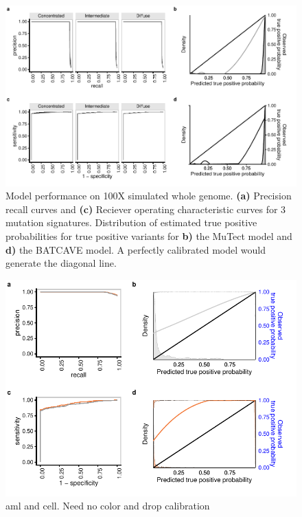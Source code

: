 \documentclass[a4,center,fleqn]{NAR}
\newcommand{\batcave}{BATCAVE }
\begin{document}
\begin{figure}[b]
  \begin{center}
  \includegraphics{figures/fig_wgs.pdf}
  \end{center}
  \caption{Model performance on 100X simulated whole genome.
  \textbf{(a)} Precision recall curves and \textbf{(c)} Reciever operating characteristic curves for 3 mutation signatures.
  Distribution of estimated true positive probabilities for true positive  variants for \textbf{b)} the MuTect model and \textbf{d)} the \batcave model.
  A perfectly calibrated model would generate the diagonal line.}
\label{NAR-wgs_fig}
\end{figure}

\begin{figure}[b]
  \begin{center}
  \includegraphics{figures/aml_plot.pdf}
  \end{center}
  \caption{aml and cell. Need no color and drop calibration}
\label{NAR-real_data_fig}
\end{figure}
\end{document}
